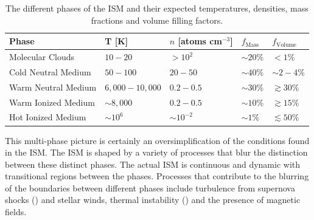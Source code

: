 \begin{table}
	\centering
	\begin{tabular}{p{4cm}|p{3cm}|p{3cm}|p{1.5cm}|p{1.5cm}}
		\hline
		\hline
		Phase & T [K] & $n$ [atoms cm$^{-3}$] & $f_{\textrm{Mass}}$ & $f_{\textrm{Volume}}$ \\
		\hline
		\hline
		Molecular Clouds & $10 - 20$ & $>10^2$ & $\sim 20\%$ & $<1\%$ \\
		Cold Neutral Medium & $50 - 100$ & $20 - 50$ & $\sim 40\%$ & $\sim2 - 4 \%$\\
		Warm Neutral Medium & $6,000 - 10,000$ & $0.2 - 0.5$ & $\sim 30\%$ & $\gtrsim 30\%$ \\
		Warm Ionized Medium & $\sim8,000$ & $0.2 - 0.5$ & $\sim 10\%$ & $\gtrsim 15\%$ \\
		Hot Ionized Medium & $\sim10^6$ & $\sim10^{-2}$ & $\sim 1\%$ & $\lesssim 50\%$ \\
		\hline
	\end{tabular}
	\caption[The temperatures, densities, mass and volume filling factors of ISM phases]{The different phases of the ISM and their expected temperatures, densities, mass fractions and volume filling factors.}
	\label{tab:ISM_phases}
\end{table}

This multi-phase picture is certainly an oversimplification of the conditions found in the ISM. The ISM is shaped by a variety of processes that blur the distinction between these distinct phases. The actual ISM is continuous and dynamic with transitional regions between the phases. Processes that contribute to the blurring of the boundaries between different phases include turbulence from supernova shocks (\citealt{MacLow_2004}) and stellar winds, thermal instability (\citealt{Kritsuk_2002}) and the presence of magnetic fields.

